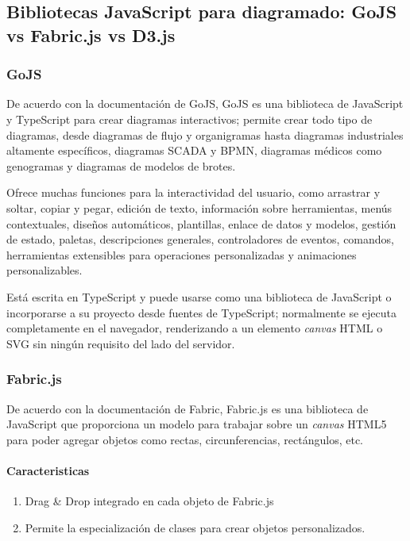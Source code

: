 \subsection{Bibliotecas JavaScript para diagramado: GoJS vs Fabric.js vs D3.js}\label{ref:sec-gojs}
\subsubsection*{GoJS}
De acuerdo con la documentación de GoJS\cite{noauthor_gojs_nodate}, GoJS es una biblioteca de JavaScript y TypeScript para crear diagramas interactivos; permite crear todo tipo de diagramas, desde diagramas de flujo y organigramas hasta diagramas industriales altamente específicos, diagramas SCADA y BPMN, diagramas médicos como genogramas y diagramas de modelos de brotes. 


Ofrece muchas funciones para la interactividad del usuario, como arrastrar y soltar, copiar y pegar, edición de texto, información sobre herramientas, menús contextuales, diseños automáticos, plantillas, enlace de datos y modelos, gestión de estado, paletas, descripciones generales, controladores de eventos, comandos, herramientas extensibles para operaciones personalizadas y animaciones personalizables.


Está escrita en TypeScript y puede usarse como una biblioteca de JavaScript o incorporarse a su proyecto desde fuentes de TypeScript; normalmente se ejecuta completamente en el navegador, renderizando a un elemento \textit{canvas} HTML o SVG sin ningún requisito del lado del servidor.


\subsubsection*{Fabric.js}

De acuerdo con la documentación de Fabric\cite{noauthor_fabric_2020}, Fabric.js es una biblioteca de JavaScript que proporciona un modelo para trabajar sobre un \textit{canvas} HTML5 para poder agregar objetos como rectas, circunferencias, rectángulos, etc.

\paragraph*{Caracteristicas}
\begin{enumerate}
    \item Drag \& Drop integrado en cada objeto de Fabric.js
    \item Permite la especialización de clases para crear objetos personalizados.
\end{enumerate}


